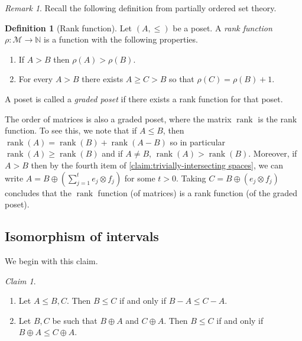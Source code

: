 \documentclass[10pt,a4paper]{article}
\newcommand{\prettyref}[1]{\cref{#1}}
\providecommand{\NN}{\mathbb{N}}
\theoremstyle{definition}
\newtheorem{definition}[theorem]{Definition}
\theoremstyle{remark}
\newtheorem{claim}[theorem]{Claim}
\newtheorem{remark}[theorem]{Remark}
\DeclareMathOperator{\rank}{rank}
\renewcommand{\leq}{\leqslant}
\renewcommand{\geq}{\geqslant}
\numberwithin{equation}{section}
\let\pref=\prettyref
\def\MP{\mathcal{M}}
\begin{document}
\begin{remark}
Recall the following definition from partially ordered set theory.
\begin{definition}[Rank function]
    Let \((A,\leq)\) be a poset. A \emph{rank function} \(\rho:\MP \to \NN\) is a function with the following properties.
\begin{enumerate}
    \item If \(A > B\) then \(\rho(A) > \rho(B)\).
    \item For every \(A > B\) there exists \(A \geq C > B\) so that \(\rho(C) = \rho(B) + 1\).
\end{enumerate}
A poset is called a \emph{graded poset} if there exists a rank function for that poset.
\end{definition}
The order of matrices is also a graded poset, where the matrix \(\rank\) is the rank function. To see this, we note that if \(A \leq B\), then \(\rank(A) = \rank(B) + \rank(A-B)\) so in particular \(\rank(A) \geq \rank(B)\) and if \(A \ne B\), \(\rank(A) > \rank(B)\). Moreover, if \(A > B\) then by the fourth item of \pref{claim:trivially-intersecting spaces}, we can write \(A = B \oplus \left ( \sum_{j=1}^t e_j \otimes f_j \right )\) for some \(t > 0\). Taking \(C = B \oplus (e_j \otimes f_j)\) concludes that the \(\rank\) function (of matrices) is a rank function (of the graded poset).
\end{remark}




\subsection{Isomorphism of intervals}

We begin with this claim.
\begin{claim} \label{claim:elementary}
    \begin{enumerate}
        \item Let \(A \leq B,C\). Then \(B \leq C\) if and only if \(B-A \leq C-A\).
        \item Let \(B,C\) be such that \(B \oplus A\) and \(C \oplus A\). Then \(B \leq C\) if and only if \(B \oplus A \leq C \oplus A\).
    \end{enumerate}
\end{claim}
\end{document}
